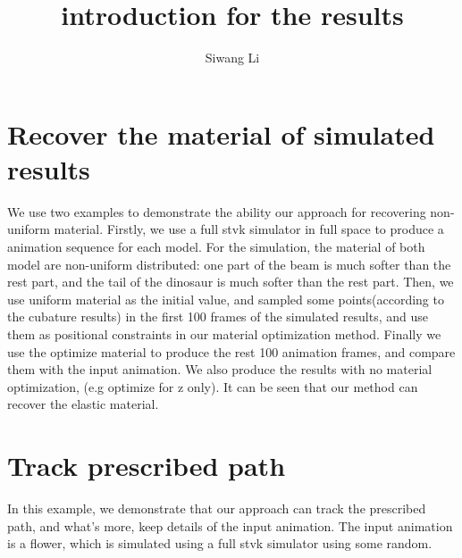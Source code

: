 \documentclass[9pt,twocolumn]{extarticle}
\author{Siwang Li}
\title{introduction for the results}
\begin{document}
\maketitle

\setlength{\parskip}{0.5ex}

\section{Recover the material of simulated results}
We use two examples to demonstrate the ability our approach for recovering
non-uniform material.  Firstly, we use a full stvk simulator in full space
to produce a animation sequence for each model. For the simulation, the material
of both model are non-uniform distributed: one part of the beam is much softer
than the rest part, and the tail of the dinosaur is much softer than the rest
part. Then, we use uniform material as the initial value, and sampled some
points(according to the cubature results) in the first 100 frames of the
simulated results, and use them as positional constraints in our material
optimization method. Finally we use the optimize material to produce the rest
100 animation frames, and compare them with the input animation. We also produce
the results with no material optimization, (e.g optimize for z only). It can be
seen that our method can recover the elastic material.

\section{Track prescribed path}
In this example, we demonstrate that our approach can track the prescribed
path, and what's more, keep details of the input animation. The input animation
is a flower, which is simulated using a full stvk simulator using some random. 

\end{document}
